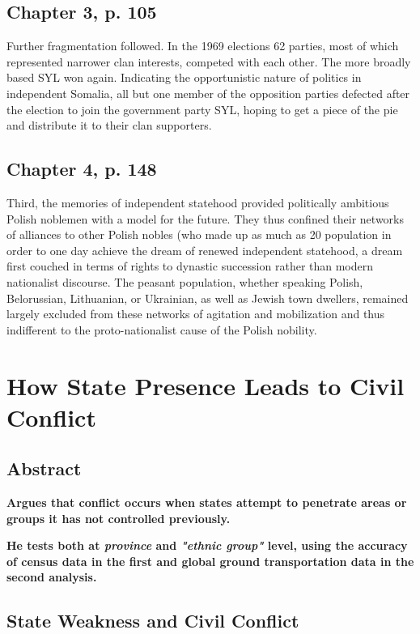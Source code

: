 \documentclass[12pt]{article}
\begin{document}
\subsection{Chapter 3, p. 105}

Further fragmentation followed.  In the 1969 elections 62 parties, most of
which represented narrower clan interests, competed with each other.  The more
broadly based SYL won again.  Indicating the opportunistic nature of politics in
independent Somalia, all but one member of the opposition parties defected after
the election to join the government party SYL, hoping to get a piece of the pie
and distribute it to their clan supporters.

\subsection{Chapter 4, p. 148}

Third, the memories of independent statehood provided politically ambitious
Polish noblemen with a model for the future.  They thus confined their networks
of alliances to other Polish nobles (who made up as much as 20%
population in order to one day achieve the dream of renewed independent
statehood, a dream first couched in terms of rights to dynastic succession
rather than modern nationalist discourse.  The peasant population, whether
speaking Polish, Belorussian, Lithuanian, or Ukrainian, as well as Jewish town
dwellers, remained largely excluded from these networks of agitation and
mobilization and thus indifferent to the proto-nationalist cause of the Polish
nobility.

\section{How State Presence Leads to Civil Conflict \citep{Ying_2020}}

\subsection{Abstract}

\textbf{Argues that conflict occurs when states attempt to penetrate areas or 
	groups it has not controlled previously.}

\textbf{He tests both at \textit{province} and \textit{"ethnic group"}
level, using the accuracy of census data in the first and global ground
transportation data in the second analysis.}

\subsection{State Weakness and Civil Conflict}
\end{document}
